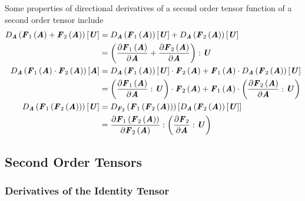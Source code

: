 Some properties of directional derivatives of a second order tensor function
of a second order tensor include
\begin{align}
  \directionalderiv{\tensor{A}}{\fnof{\tensor{F}_{1}}{\tensor{A}}
    +\fnof{\tensor{F}_{2}}{\tensor{A}}}{\tensor{U}}
  &=\directionalderiv{\tensor{A}}{\fnof{\tensor{F}_{1}}{\tensor{A}}}{\tensor{U}}
  +\directionalderiv{\tensor{A}}{\fnof{\tensor{F}_{2}}{\tensor{A}}}{\tensor{U}}
  \nonumber \\
  &=\doubledotprod{\pbrac{\delby{\fnof{\tensor{F}_{1}}{\tensor{A}}}{\tensor{A}}
      +\delby{\fnof{\tensor{F}_{2}}{\tensor{A}}}{\tensor{A}}}}{\tensor{U}}
  \label{eqn:AdditionRuleDirectDerivTensorValueTensorFunction}\\
  \directionalderiv{\tensor{A}}{\dotprod{\fnof{\tensor{F}_{1}}{\tensor{A}}}{\fnof{\tensor{F}_{2}}{\tensor{A}}}}{\tensor{A}}
  &=\dotprod{\directionalderiv{\tensor{A}}{\fnof{\tensor{F}_{1}}{\tensor{A}}}{\tensor{U}}}{\fnof{\tensor{F}_{2}}{\tensor{A}}}
  +\dotprod{\fnof{\tensor{F}_{1}}{\tensor{A}}}{\directionalderiv{\tensor{A}}{\fnof{\tensor{F}_{2}}{\tensor{A}}}{\tensor{U}}}
   \nonumber \\
  &=\dotprod{\pbrac{\doubledotprod{\delby{\fnof{\tensor{F}_{1}}{\tensor{A}}}{\tensor{A}}}{\tensor{U}}}}{\fnof{\tensor{F}_{2}}{\tensor{A}}}
  +\dotprod{\fnof{\tensor{F}_{1}}{\tensor{A}}}{\pbrac{\doubledotprod{\delby{\fnof{\tensor{F}_{2}}{\tensor{A}}}{\tensor{A}}}{\tensor{U}}}}
  \label{eqn:ProductRuleDirectDerivTensorValueTensorFunction}\\
  \directionalderiv{\tensor{A}}{\fnof{\tensor{F}_{1}}{\fnof{\tensor{F}_{2}}{\tensor{A}}}}{\tensor{U}}
  &=\directionalderiv{\tensor{F}_{2}}{\fnof{\tensor{F}_{1}}{\fnof{\tensor{F}_{2}}{\tensor{A}}}}{\directionalderiv{\tensor{A}}{\fnof{\tensor{F}_{2}}{\tensor{A}}}{\tensor{U}}}
   \nonumber \\ 
  &=\doubledotprod{\delby{\fnof{\tensor{F}_{1}}{\fnof{\tensor{F}_{2}}{\tensor{A}}}}{\fnof{\tensor{F}_{2}}{\tensor{A}}}}{\pbrac{\doubledotprod{\delby{\tensor{F}_{2}}{\tensor{A}}}{\tensor{U}}}}
  \label{eqn:ChainRuleDirectDerivTensorValueTensorFunction}
\end{align}

\subsection{Second Order Tensors}
\label{subsec:TensorCalculusSecondOrder}

\subsubsection{Derivatives of the Identity Tensor}
\label{subsubsec:IdentityDerivativeSecondOrder}

